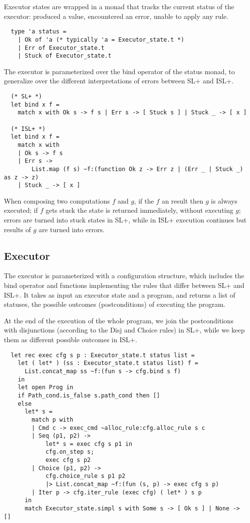 \documentclass{scrartcl}
\begin{document}
Executor states are wrapped in a monad that tracks the current status of the executor: produced a value, encountered an error, unable to apply any rule.

\begin{verbatim}
  type 'a status =
    | Ok of 'a (* typically 'a = Executor_state.t *)
    | Err of Executor_state.t
    | Stuck of Executor_state.t
\end{verbatim}

The executor is parameterized over the bind operator of the status monad, to generalize over the different interpretations of errors between SL+ and ISL+.

\begin{verbatim}
  (* SL+ *)
  let bind x f =
    match x with Ok s -> f s | Err s -> [ Stuck s ] | Stuck _ -> [ x ]

  (* ISL+ *)
  let bind x f =
    match x with
    | Ok s -> f s
    | Err s ->
        List.map (f s) ~f:(function Ok z -> Err z | (Err _ | Stuck _) as z -> z)
    | Stuck _ -> [ x ]
\end{verbatim}

When composing two computations \(f\) and \(g\), if the \(f\) an  result then \(g\) is always executed; if \(f\) gets stuck the state is returned immediately, without executing \(g\); errors are turned into stuck states in SL+, while in ISL+ execution continues but  results of \(g\) are turned into errors.

\subsection{Executor}

The executor is parameterized with a configuration structure, which includes the bind operator and functions implementing the rules that differ between SL+ and ISL+. It takes as input an executor state and a program, and returns a list of statuses, the possible outcomes (postconditions) of executing the program.

At the end of the execution of the whole program, we join the postconditions with disjunctions (according to the Disj and Choice rules) in SL+, while we keep them as different possible outcomes in ISL+.

\begin{verbatim}
  let rec exec cfg s p : Executor_state.t status list =
    let ( let* ) (ss : Executor_state.t status list) f =
      List.concat_map ss ~f:(fun s -> cfg.bind s f)
    in
    let open Prog in
    if Path_cond.is_false s.path_cond then []
    else
      let* s =
        match p with
        | Cmd c -> exec_cmd ~alloc_rule:cfg.alloc_rule s c
        | Seq (p1, p2) ->
            let* s = exec cfg s p1 in
            cfg.on_step s;
            exec cfg s p2
        | Choice (p1, p2) ->
            cfg.choice_rule s p1 p2
            |> List.concat_map ~f:(fun (s, p) -> exec cfg s p)
        | Iter p -> cfg.iter_rule (exec cfg) ( let* ) s p
      in
      match Executor_state.simpl s with Some s -> [ Ok s ] | None -> []
\end{verbatim}
\end{document}
